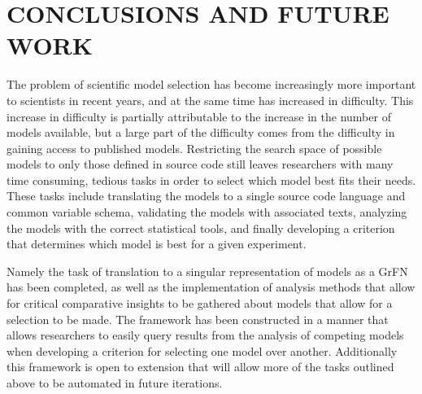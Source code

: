 \chapter{CONCLUSIONS AND FUTURE WORK\label{chapter:conc_and_future}}



The problem of scientific model selection has become increasingly more important to scientists in recent years, and at the same time has increased in difficulty.
This increase in difficulty is partially attributable to the increase in the number of models available, but a large part of the difficulty comes from the difficulty in gaining access to published models.
Restricting the search space of possible models to only those defined in source code still leaves researchers with many time consuming, tedious tasks in order to select which model best fits their needs.
These tasks include translating the models to a single source code language and common variable schema, validating the models with associated texts, analyzing the models with the correct statistical tools, and finally developing a criterion that determines which model is best for a given experiment.


Namely the task of translation to a singular representation of models as a GrFN has been completed, as well as the implementation of analysis methods that allow for critical comparative insights to be gathered about models that allow for a selection to be made.
The framework has been constructed in a manner that allows researchers to easily query results from the analysis of competing models when developing a criterion for selecting one model over another.
Additionally this framework is open to extension that will allow more of the tasks outlined above to be automated in future iterations.


